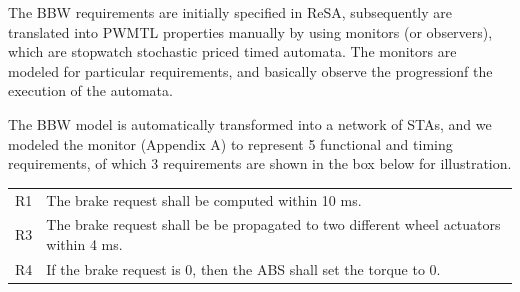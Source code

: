 The BBW requirements are initially specified in ReSA, subsequently are translated into PWMTL properties manually by using monitors (or observers), which are stopwatch stochastic priced timed automata. The monitors are modeled for particular requirements, and basically observe the progressionf the execution of the automata.
\begin{example}\label{ex_resa}
	The BBW model is automatically transformed into a network of STAs, and we modeled the monitor (Appendix A) to represent 5 functional and timing requirements, of which 3 requirements are shown in the box below for illustration. \vspace{0.2cm}
\begin{elaboration}{0.9}
	\small
	{}
	\begin{tabular}{lp{}}
	R1 & The brake request shall be computed within 10 ms. \\
	R3 & The brake request shall be be propagated to two different wheel actuators within 4 ms.\\
	R4 & If the brake request is 0, then the ABS shall set the torque to 0. \\
\end{tabular}
\end{elaboration}
\end{example}

